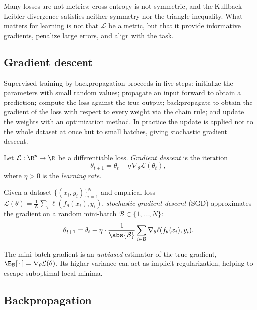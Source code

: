 Many losses are not metrics: cross-entropy is not symmetric, and the
Kullback--Leibler divergence satisfies neither symmetry nor the triangle
inequality. What matters for learning is not that $\mathcal{L}$ be a metric, but
that it provide informative gradients, penalize large errors, and align with the
task.

\subsection{Gradient descent}
\label{sec:found:gradient-descent}

Supervised training by backpropagation proceeds in five steps: initialize the
parameters with small random values; propagate an input forward to obtain a
prediction; compute the loss against the true output; backpropagate to obtain the
gradient of the loss with respect to every weight via the chain rule; and update
the weights with an optimization method. In practice the update is applied not to
the whole dataset at once but to small batches, giving stochastic gradient
descent.

\begin{definition}
\label{def:found:gd}
Let $\mathcal{L} : \R^p \to \R$ be a differentiable loss. \emph{Gradient
descent} is the iteration
\[
  \theta_{t+1} = \theta_t - \eta\, \nabla_\theta \mathcal{L}(\theta_t),
\]
where $\eta > 0$ is the \emph{learning rate}.
\end{definition}

\begin{definition}
\label{def:found:sgd}
Given a dataset $\{(x_i, y_i)\}_{i=1}^N$ and empirical loss
$\mathcal{L}(\theta) = \frac{1}{N}\sum_i \ell(f_\theta(x_i), y_i)$,
\emph{stochastic gradient descent} (SGD) approximates the gradient on a random
mini-batch $\mathcal{B} \subset \{1,\ldots,N\}$:
\[
  \theta_{t+1} = \theta_t - \eta \cdot \frac{1}{\abs{\mathcal{B}}}
  \sum_{i \in \mathcal{B}} \nabla_\theta \ell(f_\theta(x_i), y_i).
\]
\end{definition}

The mini-batch gradient is an \emph{unbiased} estimator of the true gradient,
$\E_{\mathcal{B}}[\,\cdot\,] = \nabla_\theta \mathcal{L}(\theta)$. Its higher
variance can act as implicit regularization, helping to escape suboptimal local
minima.

\subsection{Backpropagation}
\label{sec:found:backprop}

